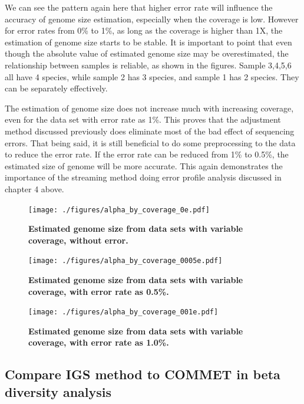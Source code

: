 We can see the pattern again here that higher error rate will influence the accuracy
of genome size estimation, especially when the coverage is low. However for error rates
from 0\% to 1\%, as long as the coverage is higher than 1X, the estimation of 
genome size starts to be stable. 
It is important to point that even though the absolute value of estimated 
genome size may be overestimated, the relationship between samples 
is reliable, as shown in the figures. Sample 3,4,5,6 all have 4 species, while 
sample 2 has 3 species, and sample 1 has 2 species. 
They can be separately effectively.

The estimation of genome size does not increase much with increasing coverage, 
even for the data set with error rate as 1\%. This proves that the adjustment method discussed
previously does eliminate most of the bad effect of sequencing errors. 
That being said, it is still beneficial to do some preprocessing to the data
to reduce the error rate. If the error rate can be reduced from 1\% to 0.5\%, the 
estimated size of genome will be more accurate. This again demonstrates the importance of
the streaming method doing error profile analysis discussed in chapter 4 above.

\begin{figure}[!ht]
 \centerline{\texttt{[image: ./figures/alpha\_by\_coverage\_0e.pdf]}}
\caption{\bf Estimated genome size from data sets with variable coverage,
without error.}
\label{fig:alpha_by_coverage_0e}
\end{figure}

\begin{figure}[!ht]
 \centerline{\texttt{[image: ./figures/alpha\_by\_coverage\_0005e.pdf]}}
\caption{\bf Estimated genome size from data sets with variable coverage, with
error rate as 0.5\%.}
\label{fig:alpha_by_coverage_0005e}
\end{figure}

\begin{figure}[!ht]
 \centerline{\texttt{[image: ./figures/alpha\_by\_coverage\_001e.pdf]}}
\caption{\bf Estimated genome size from data sets with variable coverage, with
error rate as 1.0\%. }
\label{fig:alpha_by_coverage_001e}
\end{figure}


\subsection{Compare IGS method to COMMET in beta diversity analysis}


